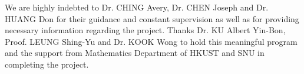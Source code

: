 We are  highly indebted to Dr. CHING Avery, Dr. CHEN Joseph and Dr. HUANG Don for their guidance and constant supervision as well as for providing necessary information regarding the project. Thanks Dr. KU Albert Yin-Bon, Proof. LEUNG Shing-Yu and Dr. KOOK Wong to hold this meaningful program and the support from Mathematics Department of HKUST and SNU in completing the project.


